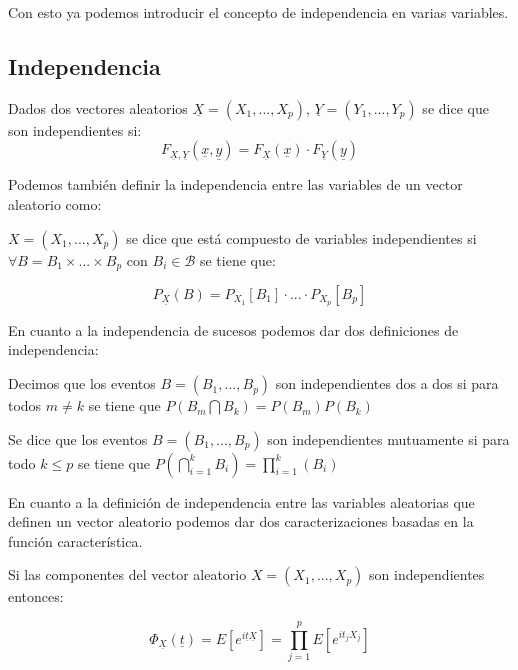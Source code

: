Con esto ya podemos introducir el concepto de independencia en varias variables. 

\subsection{Independencia}

\begin{definicion}
	Dados dos vectores aleatorios $\underline{X} = (X_1 , ... , X_p)$, $\underline{Y} = (Y_1 , ... , Y_p)$ se dice que son independientes si:
	$$F_{\underline{X}, \underline{Y}}(\underline{x}, \underline{y}) = F_{\underline{X}}(\underline{x}) \cdot F_{\underline{Y}}(\underline{y})$$
\end{definicion}

Podemos también definir la independencia entre las variables de un vector aleatorio como:

\begin{definicion}
	$X = (X_1 , ... , X_p)$ se dice que está compuesto de variables independientes si $\forall B = B_1 \times ... \times B_p$ con $B_i \in \mathcal{B}$ se tiene que:
	
	$$P_{\underline{X}}(B) = P_{X_1}[B_1] \cdot ... \cdot P_{X_p}[B_p]$$
\end{definicion}

En cuanto a la independencia de sucesos podemos dar dos definiciones de independencia:

\begin{definicion}
	Decimos que los eventos $B = (B_1 , ... , B_p)$ son independientes dos a dos si para todos $m\neq k$ se tiene que $P(B_m \bigcap B_k) = P(B_m)P(B_k)$
\end{definicion}

\begin{definicion}
	Se dice que los eventos $B = (B_1 , ... , B_p)$ son independientes mutuamente si para todo $k\leq p$ se tiene que $P(\bigcap_{i=1}^{k}B_i) = \prod_{i=1}^{k}(B_i)$
\end{definicion}

En cuanto a la definición de independencia entre las variables aleatorias que definen un vector aleatorio podemos dar dos caracterizaciones basadas en la función característica.

\begin{proposicion}
	Si las componentes del vector aleatorio $X = (X_1 , ... , X_p)$ son independientes entonces:
	
	$$\Phi_{\underline{X}}(\underline{t}) = E[e^{i\underline{t}\underline{X}}] = \prod_{j=1}^{p}E[e^{it_j X_j}]$$
\end{proposicion}

